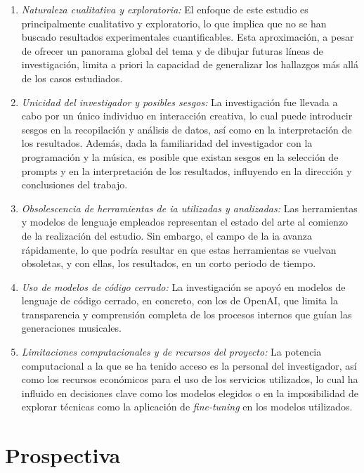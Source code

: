 \begin{enumerate}
    
\item \textit{Naturaleza cualitativa y exploratoria:} El enfoque de este estudio es principalmente cualitativo y exploratorio, lo que implica que no se han buscado resultados experimentales cuantificables. Esta aproximación, a pesar de ofrecer un panorama global del tema y de dibujar futuras líneas de investigación, limita a priori la capacidad de generalizar los hallazgos más allá de los casos estudiados.

\item \textit{Unicidad del investigador y posibles sesgos:} La investigación fue llevada a cabo por un único individuo en interacción creativa, lo cual puede introducir sesgos en la recopilación y análisis de datos, así como en la interpretación de los resultados. Además, dada la familiaridad del investigador con la programación y la música, es posible que existan sesgos en la selección de prompts y en la interpretación de los resultados, influyendo en la dirección y conclusiones del trabajo.

\item \textit{Obsolescencia de herramientas de \gls{ia} utilizadas y analizadas:} Las herramientas y modelos de lenguaje empleados representan el estado del arte al comienzo de la realización del estudio. Sin embargo, el campo de la \gls{ia} avanza rápidamente, lo que podría resultar en que estas herramientas se vuelvan obsoletas, y con ellas, los resultados, en un corto periodo de tiempo.

\item \textit{Uso de modelos de código cerrado:} La investigación se apoyó en modelos de lenguaje de código cerrado, en concreto, con los de OpenAI, que limita la transparencia y comprensión completa de los procesos internos que guían las generaciones musicales.

\item \textit{Limitaciones computacionales y de recursos del proyecto:} La potencia computacional a la que se ha tenido acceso es la personal del investigador, así como los recursos económicos para el uso de los servicios utilizados, lo cual ha influido en decisiones clave como los modelos elegidos o en la imposibilidad de explorar técnicas como la aplicación de \emph{fine-tuning} en los modelos utilizados.
\end{enumerate}

\section{Prospectiva}


